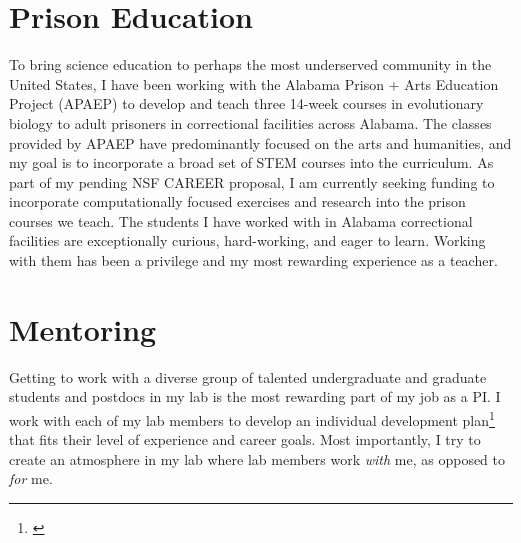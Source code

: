 \section*{Prison Education}
To bring science education to perhaps the most underserved community in the
United States,
I have been working with
the Alabama Prison + Arts Education Project (APAEP) to develop and teach three
14-week courses in evolutionary biology to adult prisoners in correctional
facilities across Alabama.
The classes provided by APAEP have predominantly focused on the
arts and humanities, and
my
goal is to incorporate a broad set of STEM courses into the
curriculum.
As part of my pending NSF CAREER proposal, I am currently
seeking funding to incorporate computationally focused
exercises and research into the prison courses we teach.
The students I have worked with in Alabama correctional facilities are
exceptionally curious, hard-working, and eager to learn.
Working with them has been a privilege and my most rewarding experience as a
teacher.

\section*{Mentoring}
Getting to work with a diverse group of talented undergraduate and graduate
students and postdocs in my lab is the most rewarding part of my job as a
PI.
I work with each of my lab members to develop an individual development
plan\footnote{\label{idp}} that fits
their level of experience and career goals.
Most importantly, I try to create an atmosphere in my lab where
lab members work \emph{with} me, as opposed to \emph{for} me.

